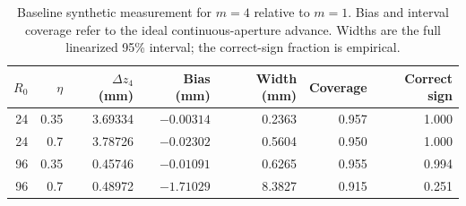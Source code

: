 \begin{table}[htbp]
\centering\small
\caption{Baseline synthetic measurement for $m=4$ relative to $m=1$.
Bias and interval coverage refer to the ideal continuous-aperture advance.
Widths are the full linearized 95\% interval; the correct-sign fraction is empirical.}
\label{tab:measurement-baseline}
\begin{tabular}{rrrrrrr}\toprule
$R_0$ & $\eta$ & $\Delta z_4$ (mm) & Bias (mm) & Width (mm) & Coverage & Correct sign\\\midrule
24 & 0.35 & 3.69334 & $-0.00314$ & 0.2363 & 0.957 & 1.000 \\
24 & 0.7 & 3.78726 & $-0.02302$ & 0.5604 & 0.950 & 1.000 \\
96 & 0.35 & 0.45746 & $-0.01091$ & 0.6265 & 0.955 & 0.994 \\
96 & 0.7 & 0.48972 & $-1.71029$ & 8.3827 & 0.915 & 0.251 \\
\bottomrule\end{tabular}
\end{table}
